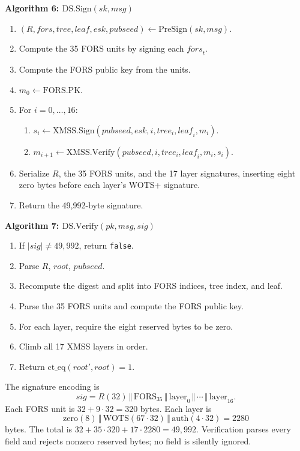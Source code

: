 \documentclass[runningheads]{llncs}
\newcommand{\concat}{\,\Vert\,}
\newenvironment{steps}[1]
  {\par\medskip\noindent\textbf{#1}\par\nopagebreak\small
   \begin{enumerate}[label=\arabic*:,leftmargin=*]}
  {\end{enumerate}\par\medskip}
\begin{document}
\begin{steps}{Algorithm 6: $\mathrm{DS.Sign}(sk,msg)$}
\item $(R,\mathit{fors},\mathit{tree},\mathit{leaf},esk,pubseed)
  \gets\mathrm{PreSign}(sk,msg)$.
\item Compute the 35 FORS units by signing each $\mathit{fors}_t$.
\item Compute the FORS public key from the units.
\item $m_0\gets\mathrm{FORS.PK}$.
\item For $i=0,\ldots,16$:
  \begin{enumerate}[label=\alph*)]
  \item $s_i\gets\mathrm{XMSS.Sign}(\mathit{pubseed},esk,i,
    \mathit{tree}_i,\mathit{leaf}_i,m_i)$.
  \item $m_{i+1}\gets\mathrm{XMSS.Verify}(\mathit{pubseed},i,
    \mathit{tree}_i,\mathit{leaf}_i,m_i,s_i)$.
  \end{enumerate}
\item Serialize $R$, the 35 FORS units, and the 17 layer signatures,
  inserting eight zero bytes before each layer's WOTS+ signature.
\item Return the 49,992-byte signature.
\end{steps}

\begin{steps}{Algorithm 7: $\mathrm{DS.Verify}(pk,msg,sig)$}
\item If $|sig|\ne49{,}992$, return \texttt{false}.
\item Parse $R$, $\mathit{root}$, $\mathit{pubseed}$.
\item Recompute the digest and split into FORS indices, tree index, and
  leaf.
\item Parse the 35 FORS units and compute the FORS public key.
\item For each layer, require the eight reserved bytes to be zero.
\item Climb all 17 XMSS layers in order.
\item Return $\mathrm{ct\_eq}(\mathit{root}',\mathit{root})=1$.
\end{steps}

The signature encoding is
\[
 \mathit{sig}=R(32)\concat
 \mathrm{FORS}_{35}\concat\mathrm{layer}_0\concat\cdots
 \concat\mathrm{layer}_{16}.
\]
Each FORS unit is $32+9\cdot32=320$ bytes.  Each layer is
\[
 \mathrm{zero}(8)\concat\mathrm{WOTS}(67\cdot32)
 \concat\mathrm{auth}(4\cdot32)=2280
\]
bytes.  The total is $32+35\cdot320+17\cdot2280=49{,}992$.
Verification parses every field and rejects nonzero reserved bytes; no
field is silently ignored.
\end{document}
